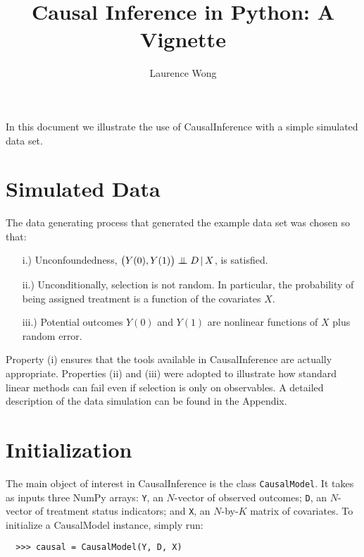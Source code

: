 \documentclass[12pt]{article}
\newcommand\independent{\protect\mathpalette{\protect\independenT}{\perp}}
\def\independenT#1#2{\mathrel{\setbox0\hbox{$#1#2$}%
\copy0\kern-\wd0\mkern4mu\box0}}  %
\theoremstyle{definition}
\theoremstyle{definition}
\theoremstyle{definition}
\theoremstyle{remark}
\begin{document}

\title{Causal Inference in Python: A Vignette}
\author{Laurence Wong}
\maketitle

In this document we illustrate the use of CausalInference with a simple simulated data set.

\section*{Simulated Data}

The data generating process that generated the example data set was chosen so that:
\begin{itemize}
\item[i.)] Unconfoundedness, $\big(Y(0), Y(1)\big) \independent D \, | \, X$, is satisfied.
\item[ii.)] Unconditionally, selection is not random. In particular, the probability of being assigned treatment is a function of the covariates $X$.
\item[iii.)] Potential outcomes $Y(0)$ and $Y(1)$ are nonlinear functions of $X$ plus random error.
\end{itemize}

Property (i) ensures that the tools available in CausalInference are actually appropriate. Properties (ii) and (iii) were adopted to illustrate how standard linear methods can fail even if selection is only on observables. A detailed description of the data simulation can be found in the Appendix.

\section*{Initialization}

The main object of interest in CausalInference is the class \texttt{CausalModel}. It takes as inputs three NumPy arrays: \texttt{Y}, an $N$-vector of observed outcomes; \texttt{D}, an $N$-vector of treatment status indicators; and \texttt{X}, an $N$-by-$K$ matrix of covariates. To initialize a CausalModel instance, simply run:

\begin{verbatim}
  >>> causal = CausalModel(Y, D, X)
\end{verbatim}
\end{document}
